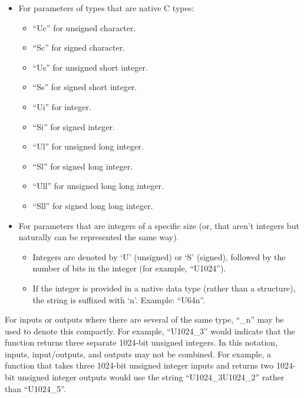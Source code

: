 \begin{itemize}
\item For parameters of types that are native C types:
      \begin{itemize}
      \item ``Uc'' for unsigned character.
      \item ``Sc'' for signed character.
      \item ``Us'' for unsigned short integer.
      \item ``Ss'' for signed short integer.
      \item ``Ui'' for integer.
      \item ``Si'' for signed integer.
      \item ``Ul'' for unsigned long integer.
      \item ``Sl'' for signed long integer.
      \item ``Ull'' for unsigned long long integer.
      \item ``Sll'' for signed long long integer.
      \end{itemize}
\item For parameters that are integers of a specific size
      (or, that aren't
      integers but naturally can be represented the same
      way).
      \begin{itemize}
      \item Integers are denoted by `U' (unsigned) or `S'
            (signed), followed by the
            number of bits in the integer
            (for example, ``U1024'').
      \item If the integer is provided in a native data
            type (rather than a
            structure), the string is suffixed with `n'.
            Example:  ``U64n''.
      \end{itemize}
\end{itemize}

For inputs or outputs where there are several of the same 
type, ``\_\underscorepostspace{}n'' may be used to denote 
this compactly.  For example, 
``U1024\_\underscorepostspace{}3'' would indicate that the 
function returns three separate 1024-bit unsigned integers.  
In this notation, inputs, input/outputs, and outputs may not 
be combined.  For example, a function that takes three 
1024-bit unsigned integer inputs and returns two 1024-bit 
unsigned integer outputs would use the string 
``U1024\_\underscorepostspace{}3U1024\_\underscorepostspace{}2'' 
rather than ``U1024\_\underscorepostspace{}5''.  

